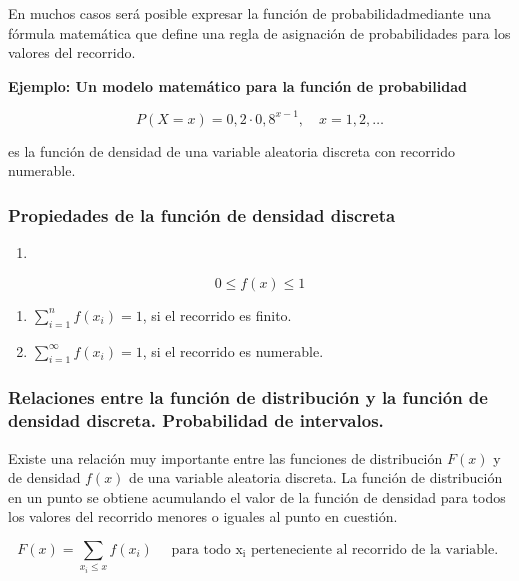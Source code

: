 \documentclass[
]{article}
\providecommand{\tightlist}{%
  \setlength{\itemsep}{0pt}\setlength{\parskip}{0pt}}
\begin{document}
En muchos casos será posible expresar la función de probabilidadmediante una fórmula
matemática que define una regla de asignación de probabilidades para los
valores del recorrido.

\textbf{Ejemplo: Un modelo matemático para la función de probabilidad}

\[
P(X=x)=0,2 \cdot 0,8^{x-1}, \quad x=1,2, \ldots
\]

es la función de densidad de una variable aleatoria discreta con
recorrido numerable.

\subsubsection{Propiedades de la función de densidad discreta}\label{propiedades-de-la-funciuxf3n-de-densidad-discreta}

\begin{enumerate}
\def\labelenumi{\arabic{enumi}.}
\tightlist
\item
\end{enumerate}

\[
0 \leq f(x) \leq 1
\]

\begin{enumerate}
\def\labelenumi{\arabic{enumi}.}
\setcounter{enumi}{1}
\tightlist
\item
  \(\sum_{i=1}^{n} f\left(x_{i}\right)=1\), si el recorrido es finito.
\item
  \(\sum_{i=1}^{\infty} f\left(x_{i}\right)=1\), si el recorrido es
  numerable.
\end{enumerate}

\subsubsection{\texorpdfstring{Relaciones entre la función de distribución y la función de densidad discreta. Probabilidad de intervalos.}{Relaciones entre la función de distribución y la función de densidad discreta.   Probabilidad de intervalos.}}\label{relaciones-entre-la-funciuxf3n-de-distribuciuxf3n-y-la-funciuxf3n-de-densidad-discreta.-probabilidad-de-intervalos.}

Existe una relación muy importante entre las funciones de distribución
\(F(x)\) y de densidad \(f(x)\) de una variable aleatoria discreta. La
función de distribución en un punto se obtiene acumulando el valor de la
función de densidad para todos los valores del recorrido menores o
iguales al punto en cuestión.

\[
F(x)=\sum_{x_{i} \leq x} f\left(x_{i}\right) \quad \text { para todo } \mathrm{x}_{\mathrm{i}} \text { perteneciente al recorrido de la variable. }
\]
\end{document}
